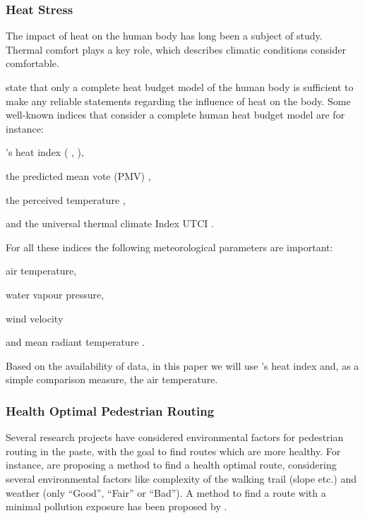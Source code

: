 \subsubsection{Heat Stress}
The impact of heat on the human body has long been a subject of study. Thermal comfort plays a key role, which describes climatic conditions consider comfortable. 

\textcite{Staiger1997} state that only a complete heat budget model of the human body is sufficient to make any reliable statements regarding the influence of heat on the body. Some well-known indices that consider a complete human heat budget model are for instance:
\begin{inparaenum}[(1)]
  \item \citeauthor{Steadman1979}'s heat index (\citeauthor{Steadman1979} \citeyear*{Steadman1979}, \citeyear*{Steadman1979a}),
  \item the predicted mean vote (PMV) \parencite{Fanger1973},
  \item the perceived temperature \parencite{Staiger1997,Jendritzky2000},
  \item and the universal thermal climate Index UTCI \parencite{Jendritzky2010}.
\end{inparaenum}

For all these indices the following meteorological parameters are important:
\begin{inparaenum}[(1)]
\item air temperature,
\item water vapour pressure,
\item wind velocity 
\item and mean radiant temperature \parencite{Jendritzky2010}.
\end{inparaenum}

Based on the availability of data, in this paper we will use \citeauthor{Steadman1979}'s heat index \parencite{Steadman1979} and, as a simple comparison measure, the air temperature.

\subsubsection{Health Optimal Pedestrian Routing}
Several research projects have considered environmental factors for pedestrian routing in the paste, with the goal to find routes which are more healthy. For instance, \textcite{Sharker2012} are proposing a method to find a health optimal route, considering several environmental factors like complexity of the walking trail (slope etc.) and weather (only “Good”, “Fair” or “Bad”). A method to find a route with a minimal pollution exposure has been proposed by \textcite{Hasenfratz2015}.

